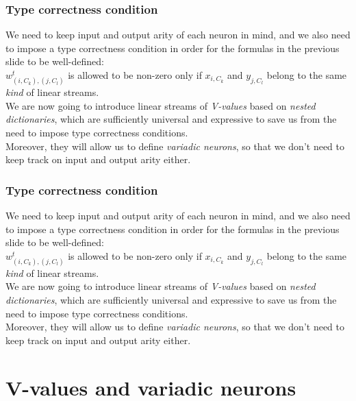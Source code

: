 \documentclass{beamer}
\newcommand{\msgray}[1]{{\color{mygray} #1}}
\begin{document}
\begin{frame}

  \frametitle{Type correctness condition}

We need to keep input and output arity of each neuron in mind, and we also need to impose a type correctness condition in order for the formulas in the previous slide to be well-defined:\\[2ex]


$w_{(i,C_k), (j,C_l)}^t$ is allowed to be
non-zero only if $x_{i,C_k}$ and $y_{j, C_l}$ belong to the same {\em kind} of linear streams.\\[4ex]

We are now going to introduce linear streams of {\em V-values} based on {\em nested dictionaries}, which are sufficiently universal and expressive to save us from the need to impose type correctness conditions.\\[2ex]

\msgray{Moreover, they will allow us to define {\em variadic neurons}, so that we don't need to keep track on input and output
arity either.}

\end{frame}

\begin{frame}

  \frametitle{Type correctness condition}

We need to keep input and output arity of each neuron in mind, and we also need to impose a type correctness condition in order for the formulas in the previous slide to be well-defined:\\[2ex]


$w_{(i,C_k), (j,C_l)}^t$ is allowed to be
non-zero only if $x_{i,C_k}$ and $y_{j, C_l}$ belong to the same {\em kind} of linear streams.\\[4ex]

We are now going to introduce linear streams of {\em V-values} based on {\em nested dictionaries}, which are sufficiently universal and expressive to save us from the need to impose type correctness conditions.\\[2ex]

Moreover, they will allow us to define {\em variadic neurons}, so that we don't need to keep track on input and output
arity either.

\end{frame}






\section{V-values and variadic neurons}
\end{document}
